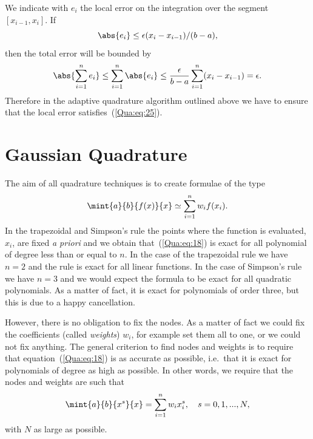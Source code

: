 \smallskip

\noindent
We indicate with $e_i$ the local error on the integration over the
segment $[x_{i-1},x_i]$. If
%
\begin{equation}
  \abs{e_i} \le \epsilon (x_i-x_{i-1})/(b-a),
  \label{Qua:eq:25}
\end{equation}
%
then the total error will be bounded by
%
\begin{equation}
  \abs{ \sum_{i=1}^n e_i} \le \sum_{i=1}^n \abs{e_i} \le
  \frac{\epsilon}{b-a} \sum_{i=1}^n (x_i-x_{i-1}) = \epsilon.
  \label{Qua:eq:26}
\end{equation}
%
Therefore in the adaptive quadrature algorithm outlined above we have
to ensure that the local error satisfies~(\ref{Qua:eq:25}).

\section{Gaussian Quadrature}

The aim of all quadrature techniques is to create formulae of the type
%
\begin{equation}
  \mint{a}{b}{f(x)}{x} \simeq \sum_{i=1}^n w_i f(x_i) .
 \label{Qua:eq:18}
\end{equation}
%
In the trapezoidal and Simpson's rule the points where the function is
evaluated, $x_i$, are fixed \textit{a priori} and we obtain
that~(\ref{Qua:eq:18}) is exact for all polynomial of degree less than
or equal to $n$.  In the case of the trapezoidal rule we have $n=2$
and the rule is exact for all linear functions.  In the case of
Simpson's rule we have $n=3$ and we would expect the formula to be
exact for all quadratic polynomials.  As a matter of fact, it is exact
for polynomials of order three, but this is due to a happy
cancellation.

However, there is no obligation to fix the nodes.  As a matter of fact
we could fix the coefficients (called \textit{weights}) $w_i$, for
example set them all to one, or we could not fix anything.  The
general criterion to find nodes and weights is to require that
equation~(\ref{Qua:eq:18}) is as accurate as possible, i.e.\ that it is
exact for polynomials of degree as high as possible.  In other words,
we require that the nodes and weights are such that
%
\begin{equation}
  \mint{a}{b}{x^s}{x} = \sum_{i=1}^n w_i x_i^s, \quad s=0,1,...,N,
  \label{Qua:eq:27}
\end{equation}
%
with $N$ as large as possible.

